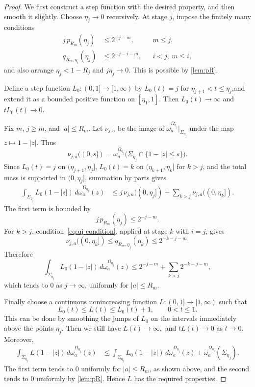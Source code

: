 \documentclass[11pt]{amsart}
\numberwithin{equation}{section}
\theoremstyle{definition}
\begin{document}
\begin{proof}
We first construct a step function with the desired property, and then smooth
it slightly.
Choose $\eta_j\to 0$ recursively.  At stage $j$, impose the finitely
many conditions
\begin{align}
        j\,p_{R_m}(\eta_j)&\le 2^{-j-m},
        && m\le j, \label{eq:pj-condition}\\
        q_{R_m,\eta_i}(\eta_j)&\le 2^{-j-i-m},
        &&i<j,\ m\le i, \label{eq:qj-condition}
\end{align}
and also arrange $\eta_j <1-R_j$ and $j\eta_j\to0$. This is possible by \cref{lem:pR}.

Define a step function $L_0:(0,1]\to[1,\infty)$ by $L_0(t)=j$ for $\eta_{j+1}<t\le\eta_j$,and extend it as a bounded positive function on $[\eta_1,1]$.  Then
$
        L_0(t)\to\infty$ and 
        $
        tL_0(t)\to0
$.

Fix $m$, $j\ge m$, and $|a|\le R_m$.  Let $\nu_{j,a}$ be the image of
$\omega_a^{\Omega_{\eta_j}}|_{\Sigma_{\eta_j}}$ under the map
$z\mapsto 1-|z|$.  Thus
$$
        \nu_{j,a}((0,s])
        =
        \omega_a^{\Omega_{\eta_j}}
        \bigl(\Sigma_{\eta_j}\cap\{1-|z|\le s\}\bigr).
$$
Since $L_0(t)=j$ on $(\eta_{j+1},\eta_j]$, $L_0(t)=k$ on
$(\eta_{k+1},\eta_k]$ for $k>j$, and the total mass is supported in
$(0,\eta_j]$, summation by parts gives
$$
\begin{aligned}
        \int_{\Sigma_{\eta_j}} L_0(1-|z|)\,
        d\omega_a^{\Omega_{\eta_j}}(z)
        &\le
        j\,\nu_{j,a}((0,\eta_j])
        +
        \sum_{k>j}\nu_{j,a}((0,\eta_k]).
\end{aligned}
$$
The first term is bounded by
$$
        j\,p_{R_m}(\eta_j)\le 2^{-j-m}.
$$
For $k>j$, condition~\eqref{eq:qj-condition}, applied at stage $k$ with
$i=j$, gives
$$
        \nu_{j,a}((0,\eta_k])
        \le
        q_{R_m,\eta_j}(\eta_k)
        \le
        2^{-k-j-m}.
$$
Therefore
$$
        \int_{\Sigma_{\eta_j}} L_0(1-|z|)\,
        d\omega_a^{\Omega_{\eta_j}}(z)
        \le
        2^{-j-m}
        +
        \sum_{k>j}2^{-k-j-m},
$$
which tends to $0$ as $j\to\infty$, uniformly for $|a|\le R_m$.

Finally choose a continuous nonincreasing function $L:(0,1]\to[1,\infty)$
such that
$$
       L_0(t)\le L(t)\le L_0(t)+1, \qquad 0<t\leq 1.
$$
This can be done by smoothing the jumps of $L_0$ on the intervals immediately
above the points $\eta_j$.  Then we still have
$
        L(t)\to\infty,$ and
        $tL(t)\to 0$ as $t\to 0$.
Moreover,
$$
\begin{aligned}
        \int_{\Sigma_{\eta_j}} L(1-|z|)\,
        d\omega_a^{\Omega_{\eta_j}}(z)
        &\le
        \int_{\Sigma_{\eta_j}} L_0(1-|z|)\,
        d\omega_a^{\Omega_{\eta_j}}(z)
        +
        \omega_a^{\Omega_{\eta_j}}(\Sigma_{\eta_j}).
\end{aligned}
$$
The first term tends to $0$ uniformly for $|a|\le R_m$, as shown above,
and the second tends to $0$ uniformly by \cref{lem:pR}.  Hence $L$
has the required properties.
\end{proof}
\end{document}
